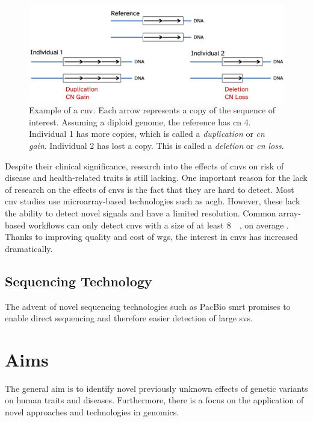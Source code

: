 \documentclass[draft]{scrbook}
\begin{document}
\begin{figure}
    \centering
    \includegraphics[width=\textwidth]{img/cnv_example.png}
    \caption{Example of a \gls{cnv}.
        Each arrow represents a copy of the sequence of interest.
        Assuming a diploid genome, the reference has \gls{cn} 4.
        Individual 1 has more copies, which is called a \textit{duplication} or \textit{\gls{cn} gain}.
        Individual 2 has lost a copy.
        This is called a \textit{deletion} or \textit{\gls{cn} loss}.}
        \label{fig:cnv}
\end{figure}

Despite their clinical significance, research into the effects of \glspl{cnv} on risk of disease and health-related traits is still lacking.
One important reason for the lack of research on the effects of \glspl{cnv} is the fact that they are hard to detect.
Most \gls{cnv} studies use microarray-based technologies such as \gls{acgh}.
However, these lack the ability to detect novel signals and have a limited resolution.
Common array-based workflows can only detect \glspl{cnv} with a size of at least \qty{8}{\kilo\base}, on average \cite{Quenez2020}.
Thanks to improving quality and cost of \gls{wgs}, the interest in \glspl{cnv} has increased dramatically.

\section{Sequencing Technology}
The advent of novel sequencing technologies such as PacBio \gls{smrt} promises to enable direct sequencing and therefore easier detection of large \glspl{sv}.

\chapter{Aims}
The general aim is to identify novel previously unknown effects of genetic variants on human traits and diseases.
Furthermore, there is a focus on the application of novel approaches and technologies in genomics.
\end{document}
